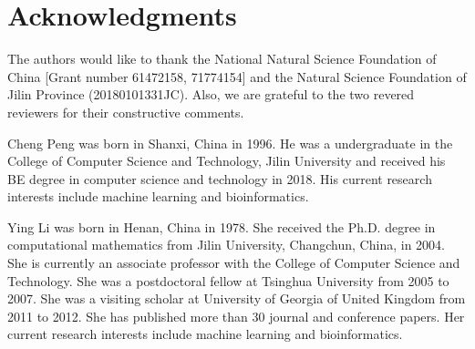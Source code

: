 \documentclass[10pt,journal,compsoc]{IEEEtran}
\begin{document}
\section*{Acknowledgments}

	The authors would like to thank the National Natural Science Foundation of China [Grant number 61472158, 71774154] and the Natural Science Foundation of Jilin Province (20180101331JC).
	Also, we are grateful to the two revered reviewers for their constructive comments.




	
\begin{IEEEbiography}{Cheng Peng} 
	was born in Shanxi, China in 1996. He was a undergraduate in the College of Computer Science and Technology, Jilin University and received his BE degree in computer science and technology in 2018. His current research interests include machine learning and bioinformatics.
\end{IEEEbiography}

\begin{IEEEbiography}{Ying Li} 
	was born in Henan, China in 1978. She received the Ph.D. degree in computational mathematics from Jilin University, Changchun, China, in 2004. She is currently an associate professor with the College of Computer Science and Technology. She was a postdoctoral fellow at Tsinghua University from 2005 to 2007. She was a visiting scholar at University of Georgia of United Kingdom from 2011 to 2012. She has published more than 30 journal and conference papers. Her current research interests include machine learning and bioinformatics.
\end{IEEEbiography}
	
\end{document}
